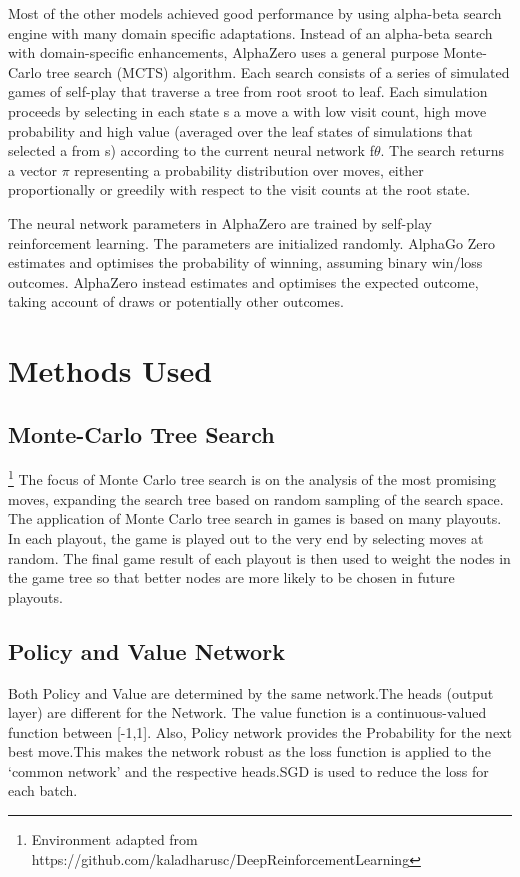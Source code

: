\documentclass{article}
\begin{document}
Most of the other models achieved good performance by using alpha-beta search engine with many domain specific adaptations. Instead of an alpha-beta search with domain-specific enhancements, AlphaZero uses a general purpose Monte-Carlo tree search (MCTS) algorithm. Each search consists of a series of simulated games of self-play that traverse a tree from root sroot to leaf. Each simulation proceeds by selecting in each state s a move a with low visit count, high move probability and high value (averaged over the leaf states of simulations that selected a from s) according to the current neural network f$\theta$.
The search returns a vector $\pi$ representing a probability distribution over moves, either proportionally or greedily with respect to the visit counts at the root state. 

The neural network parameters in AlphaZero are trained by self-play reinforcement learning. The parameters are initialized randomly. AlphaGo Zero estimates and optimises the probability of winning, assuming binary win/loss outcomes. AlphaZero instead estimates and optimises the expected outcome, taking account of draws or potentially other outcomes.


\section{Methods Used}

\subsection{Monte-Carlo Tree Search}\footnote[1]{Environment adapted from             https://github.com/kaladharusc/DeepReinforcementLearning}
The focus of Monte Carlo tree search is on the analysis of the most promising moves, expanding the search tree based on random sampling of the search space. The application of Monte Carlo tree search in games is based on many playouts. In each playout, the game is played out to the very end by selecting moves at random. The final game result of each playout is then used to weight the nodes in the game tree so that better nodes are more likely to be chosen in future playouts.

\subsection{Policy and Value Network} 
    Both Policy and Value are determined by the same network.The heads (output layer) are different for the Network. The value function is a continuous-valued function between [-1,1]. Also, Policy network provides the Probability for the next best move.This makes the network robust as the loss function is applied to the ‘common network’ and the respective heads.SGD is used to reduce the loss for each batch.
    
\end{document}

